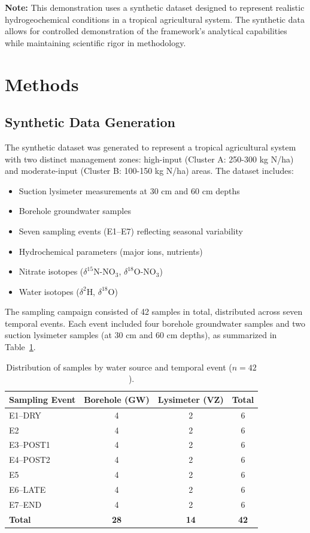 \documentclass[12pt,a4paper]{article}
\begin{document}
\textbf{Note:} This demonstration uses a synthetic dataset designed to represent realistic hydrogeochemical conditions in a tropical agricultural system. The synthetic data allows for controlled demonstration of the framework's analytical capabilities while maintaining scientific rigor in methodology.

\section{Methods}

\subsection{Synthetic Data Generation}

The synthetic dataset was generated to represent a tropical agricultural system with two distinct management zones: high-input (Cluster A: 250-300 kg N/ha) and moderate-input (Cluster B: 100-150 kg N/ha) areas. The dataset includes:
\begin{itemize}
	\item Suction lysimeter measurements at 30 cm and 60 cm depths
	\item Borehole groundwater samples
	\item Seven sampling events (E1--E7) reflecting seasonal variability
	\item Hydrochemical parameters (major ions, nutrients)
	\item Nitrate isotopes ($\delta^{15}$N-NO$_3$, $\delta^{18}$O-NO$_3$)
	\item Water isotopes ($\delta^{2}$H, $\delta^{18}$O)
\end{itemize}

The sampling campaign consisted of 42 samples in total, distributed across seven temporal events. Each event included four borehole groundwater samples and two suction lysimeter samples (at 30 cm and 60 cm depths), as summarized in Table~\ref{tab:sampling_summary}.

\begin{table}[htbp]
	\centering
	\caption{Distribution of samples by water source and temporal event ($n=42$).}
	\label{tab:sampling_summary}
	\begin{tabular}{lccc}
		\toprule
		Sampling Event & Borehole (GW) & Lysimeter (VZ) & Total \\
		\midrule
		E1--DRY   & 4 & 2 & 6 \\
		E2        & 4 & 2 & 6 \\
		E3--POST1 & 4 & 2 & 6 \\
		E4--POST2 & 4 & 2 & 6 \\
		E5        & 4 & 2 & 6 \\
		E6--LATE  & 4 & 2 & 6 \\
		E7--END   & 4 & 2 & 6 \\
		\midrule
		\textbf{Total} & \textbf{28} & \textbf{14} & \textbf{42} \\
		\bottomrule
	\end{tabular}
\end{table}
\end{document}
